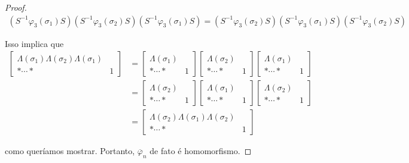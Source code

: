 \begin{proof}
		\begin{align*}
		(S^{-1}\varphi_3(\sigma_1)S)(S^{-1}\varphi_3(\sigma_2)S)(S^{-1}\varphi_3(\sigma_1)S) = (S^{-1}\varphi_3(\sigma_2)S)(S^{-1}\varphi_3(\sigma_1)S)(S^{-1}\varphi_3(\sigma_2)S)
		\end{align*}
		\par\vspace{0.3cm} Isso implica que 
		\begin{align*}
		\left[\begin{array}{c|c}
		\Lambda(\sigma_1)\Lambda(\sigma_2)\Lambda(\sigma_1) & \\
		\hline 
		\ast\cdots\ast & 1
		\end{array}\right] &= \left[\begin{array}{c|c}
		\Lambda(\sigma_1) & \\
		\hline
		\ast\cdots\ast & 1
		\end{array}\right]\left[\begin{array}{c|c}
		\Lambda(\sigma_2) & \\
		\hline
		\ast\cdots\ast & 1
		\end{array}\right]\left[\begin{array}{c|c}
		\Lambda(\sigma_1) & \\
		\hline
		\ast\cdots\ast & 1
		\end{array}\right] \\ 
		&= \left[\begin{array}{c|c}
		\Lambda(\sigma_2) & \\
		\hline
		\ast\cdots\ast & 1
		\end{array}\right]\left[\begin{array}{c|c}
		\Lambda(\sigma_1) & \\
		\hline
		\ast\cdots\ast & 1
		\end{array}\right]\left[\begin{array}{c|c}
		\Lambda(\sigma_2) & \\
		\hline
		\ast\cdots\ast & 1
		\end{array}\right] \\
		&= \left[\begin{array}{c|c}
		\Lambda(\sigma_2)\Lambda(\sigma_1)\Lambda(\sigma_2) & \\
		\hline
		\ast\cdots\ast & 1
		\end{array}\right]
		\end{align*}
		\par\vspace{0.3cm} como queríamos mostrar. Portanto, $\overline{\varphi}_n$ de fato é homomorfismo.
	\end{proof}
